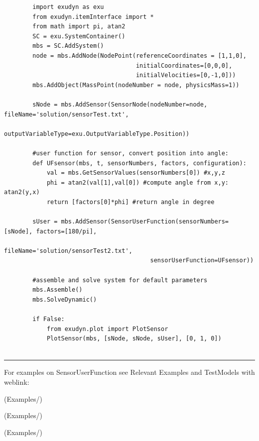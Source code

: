    \pythonstyle\begin{lstlisting}
        import exudyn as exu
        from exudyn.itemInterface import *
        from math import pi, atan2
        SC = exu.SystemContainer()
        mbs = SC.AddSystem()
        node = mbs.AddNode(NodePoint(referenceCoordinates = [1,1,0], 
                                     initialCoordinates=[0,0,0],
                                     initialVelocities=[0,-1,0]))
        mbs.AddObject(MassPoint(nodeNumber = node, physicsMass=1))
        
        sNode = mbs.AddSensor(SensorNode(nodeNumber=node, fileName='solution/sensorTest.txt',
                              outputVariableType=exu.OutputVariableType.Position))

        #user function for sensor, convert position into angle:
        def UFsensor(mbs, t, sensorNumbers, factors, configuration):
            val = mbs.GetSensorValues(sensorNumbers[0]) #x,y,z
            phi = atan2(val[1],val[0]) #compute angle from x,y: atan2(y,x)
            return [factors[0]*phi] #return angle in degree
        
        sUser = mbs.AddSensor(SensorUserFunction(sensorNumbers=[sNode], factors=[180/pi], 
                                         fileName='solution/sensorTest2.txt',
                                         sensorUserFunction=UFsensor))

        #assemble and solve system for default parameters
        mbs.Assemble()
        mbs.SolveDynamic()

        if False:
            from exudyn.plot import PlotSensor
            PlotSensor(mbs, [sNode, sNode, sUser], [0, 1, 0])
        
    \end{lstlisting}
\vspace{6pt}\par\noindent\rule{\textwidth}{0.4pt}
%
\noindent For examples on SensorUserFunction see Relevant Examples and TestModels with weblink:
\bi
\item {} (Examples/)
\item {} (Examples/)
\item {} (Examples/)
